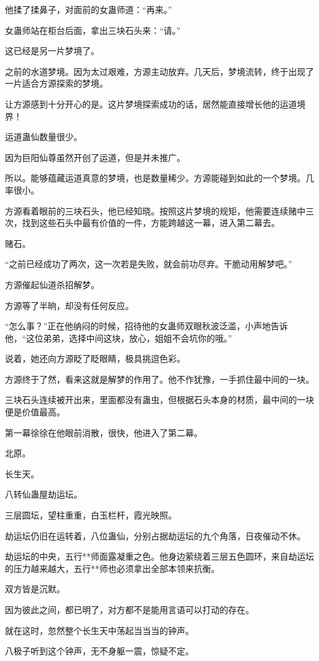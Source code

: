 \begin{this_body}
他揉了揉鼻子，对面前的女蛊师道：“再来。”

女蛊师站在柜台后面，拿出三块石头来：“请。”

这已经是另一片梦境了。

之前的水道梦境。因为太过艰难，方源主动放弃。几天后，梦境流转，终于出现了一片适合方源探索的梦境。

让方源感到十分开心的是。这片梦境探索成功的话，居然能直接增长他的运道境界！

运道蛊仙数量很少。

因为巨阳仙尊虽然开创了运道，但是并未推广。

所以。能够蕴藏运道真意的梦境，也是数量稀少。方源能碰到如此的一个梦境。几率很小。

方源看着眼前的三块石头，他已经知晓。按照这片梦境的规矩，他需要连续赌中三次，找到这些石头中最有价值的一件，方能跨越这一幕，进入第二幕去。

赌石。

“之前已经成功了两次，这一次若是失败，就会前功尽弃。干脆动用解梦吧。”

方源催起仙道杀招解梦。

方源等了半晌，却没有任何反应。

“怎么事？”正在他纳闷的时候，招待他的女蛊师双眼秋波泛滥，小声地告诉他，“这位弟弟，选择中间这块，放心，姐姐不会坑你的哦。”

说着，她还向方源眨了眨眼睛，极具挑逗色彩。

方源终于了然，看来这就是解梦的作用了。他不作犹豫，一手抓住最中间的一块。

三块石头连续被开出来，里面都没有蛊虫，但根据石头本身的材质，最中间的一块便是价值最高。

第一幕徐徐在他眼前消散，很快，他进入了第二幕。

北原。

长生天。

八转仙蛊屋劫运坛。

三层圆坛，望柱重重，白玉栏杆，霞光映照。

劫运坛仍旧在运转着，八位蛊仙，分别占据劫运坛的九个角落，日夜催动不休。

劫运坛的中央，五行**师面露凝重之色。他身边萦绕着三层五色圆环，来自劫运坛的压力越来越大，五行**师也必须拿出全部本领来抗衡。

双方皆是沉默。

因为彼此之间，都已明了，对方都不是能用言语可以打动的存在。

就在这时，忽然整个长生天中荡起当当当的钟声。

八极子听到这个钟声，无不身躯一震，惊疑不定。


\end{this_body}
